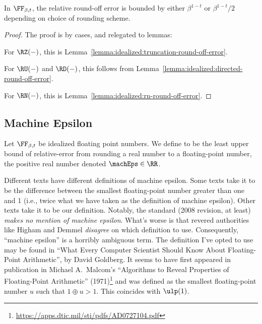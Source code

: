 \begin{thm}\label{thm:idealized:round-off-error-bounds}
  In $\FF_{\beta,t}$, the relative round-off error is bounded by either
  $\beta^{1-t}$ or $\beta^{1-t}/2$ depending on choice of rounding scheme.
\end{thm}
\begin{proof}
  The proof is by cases, and relegated to lemmas:

  For $\RZ(-)$, this is Lemma~\ref{lemma:idealized:truncation-round-off-error}.
  
  For $\RU(-)$ and $\RD(-)$, this follows from Lemma~\ref{lemma:idealized:directed-round-off-error}.

  For $\RN(-)$, this is Lemma~\ref{lemma:idealized:rn-round-off-error}.
\end{proof}

\subsection{Machine Epsilon}

\begin{defn}\label{defn:idealized:machine-epsilon}
Let $\FF_{\beta,t}$ be idealized floating point numbers. We define
\index{$\machEps$} to be the least upper bound of relative-error from
rounding a real number to a floating-point number,
the positive real number denoted $\machEps\in\RR$.
\end{defn}

\begin{ddanger}
  Different texts have different definitions of machine epsilon. Some
  texts take it to be the difference between the smallest floating-point
  number greater than one and 1 (i.e., twice what we have taken as the
  definition of machine epsilon). Other texts take it to be our
  definition. Notably, the  standard (2008 revision, at least)
  \emph{makes no mention of machine epsilon}. What's worse is that
  revered authorities like Higham and Demmel \emph{disagree} on which
  definition to use. Consequently, ``machine epsilon'' is a horribly
  ambiguous term. The definition I've opted to use may be found in
  ``What Every Computer Scientist Should Know About Floating-Point
  Arithmetic'', by David Goldberg.
  It seems to have first appeared in publication in Michael A.\ Malcom's
  ``Algorithms to Reveal Properties of Floating-Point Arithmetic'' (1971)\footnote{\url{https://apps.dtic.mil/sti/pdfs/AD0727104.pdf}}
  and was defined as the smallest floating-point number $u$ such that
  $1\oplus u>1$. This coincides with $\ulp(1)$.
\end{ddanger}

